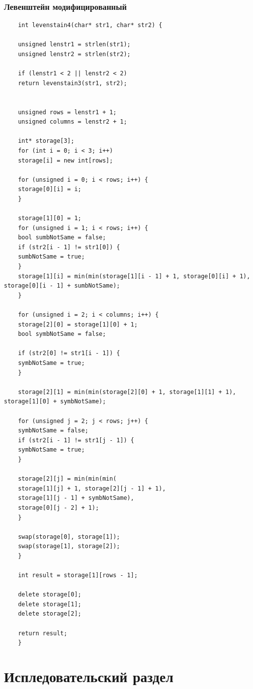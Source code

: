 \documentclass[a4paper, 14pt]{article}
\begin{document}
	\hspace{2}
	\subsubsection{Левенштейн модифицированный}
	\begin{lstlisting}
	int levenstain4(char* str1, char* str2) {
	
	unsigned lenstr1 = strlen(str1);
	unsigned lenstr2 = strlen(str2);
	
	if (lenstr1 < 2 || lenstr2 < 2)
	return levenstain3(str1, str2);
	
	
	unsigned rows = lenstr1 + 1;
	unsigned columns = lenstr2 + 1;
	
	int* storage[3];
	for (int i = 0; i < 3; i++)
	storage[i] = new int[rows];
	
	for (unsigned i = 0; i < rows; i++) {
	storage[0][i] = i;
	}
	
	storage[1][0] = 1;
	for (unsigned i = 1; i < rows; i++) {
	bool sumbNotSame = false;
	if (str2[i - 1] != str1[0]) {
	sumbNotSame = true;
	}
	storage[1][i] = min(min(storage[1][i - 1] + 1, storage[0][i] + 1), storage[0][i - 1] + sumbNotSame);
	}
	
	for (unsigned i = 2; i < columns; i++) {
	storage[2][0] = storage[1][0] + 1;
	bool symbNotSame = false;
	
	if (str2[0] != str1[i - 1]) {
	symbNotSame = true;
	}
	
	storage[2][1] = min(min(storage[2][0] + 1, storage[1][1] + 1), storage[1][0] + symbNotSame);
	
	for (unsigned j = 2; j < rows; j++) {
	symbNotSame = false;
	if (str2[i - 1] != str1[j - 1]) {
	symbNotSame = true;
	}
	
	storage[2][j] = min(min(min(
	storage[1][j] + 1, storage[2][j - 1] + 1),
	storage[1][j - 1] + symbNotSame),
	storage[0][j - 2] + 1);
	}
	
	swap(storage[0], storage[1]);
	swap(storage[1], storage[2]);
	}
	
	int result = storage[1][rows - 1];
	
	delete storage[0];
	delete storage[1];
	delete storage[2];
	
	return result;
	}
	\end{lstlisting}
	
	
	
	\newpage
	\section{Испледовательский раздел}
	
\end{document}
